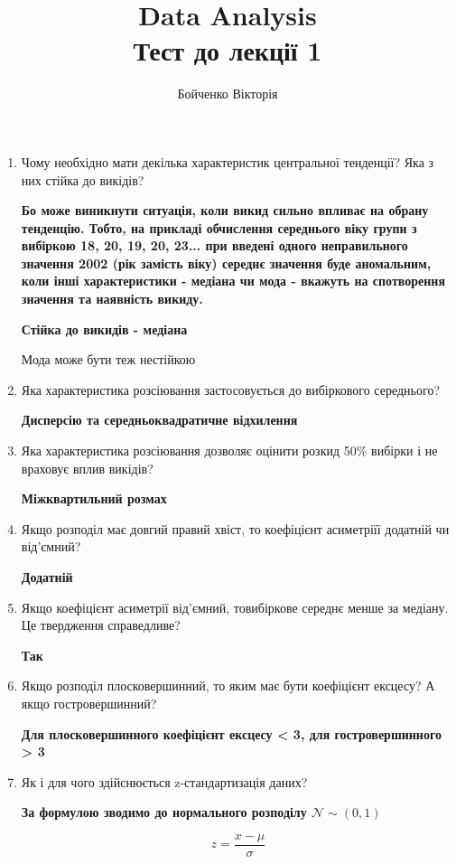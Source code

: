 \documentclass[12pt]{extarticle}
\title{Data Analysis \\  Тест до лекції 1}
\author{Бойченко Вікторія}
\date{}
\begin{document}
\maketitle

\begin{enumerate}

\item  Чому необхідно мати декілька характеристик центральної тенденції? Яка з них стійка до викідів?

\textbf{Бо може виникнути ситуація, коли викид сильно впливає на обрану тенденцію. Тобто, на прикладі обчислення середнього віку групи з вибіркою 18, 20, 19, 20, 23... при введені одного неправильного значення 2002 (рік замість віку) середнє значення буде аномальним, коли інші характеристики - медіана чи мода - вкажуть на спотворення значення та наявність викиду.}

\textbf{Стійка до викидів - медіана}

Мода може бути теж нестійкою

\item Яка характеристика розсіювання застосовується до вибіркового середнього?

\textbf{Дисперсію та середньоквадратичне відхилення}

\item Яка характеристика розсіювання дозволяє оцінити розкид 50${\%}$ вибірки і не враховує вплив викідів?

\textbf{Міжквартильний розмах}

\item Якщо розподіл має довгий правий хвіст, то коефіцієнт асиметріїї додатній чи від’ємний?

\textbf{Додатній}

\item Якщо коефіцієнт асиметрії від’ємний, товибіркове середнє менше за медіану. Це твердження справедливе?

\textbf{Так}

\item Якщо розподіл плосковершинний, то яким має бути коефіцієнт ексцесу? А якщо гостровершинний?

\textbf{Для плосковершинного коефіцієнт ексцесу < 3, для гостровершинного > 3}

\item Як і для чого здійснюється z-стандартизація даних?

\textbf{За формулою зводимо до нормального розподілу $\mathcal{N}\sim(0,1)$ } 

\[ z=\frac{x-\mu}{\sigma} \]


\end{enumerate}
\end{document}
